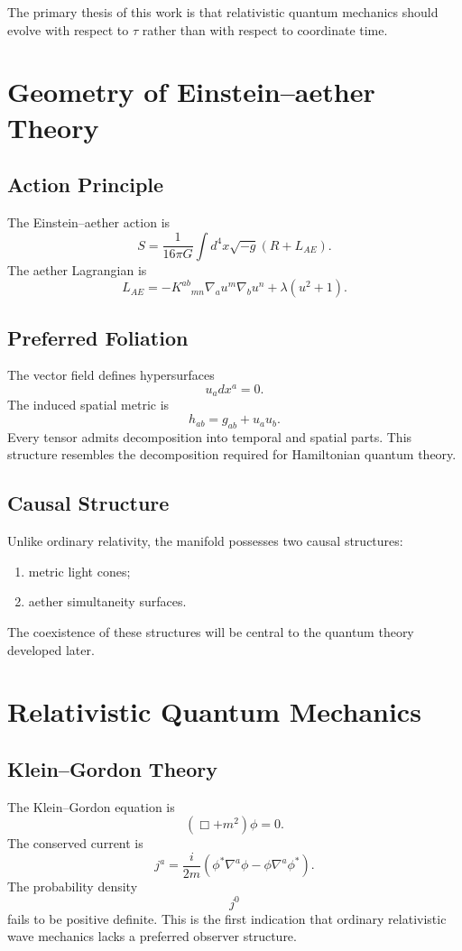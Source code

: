 \documentclass[11pt]{book}
\begin{document}
The primary thesis of this work is that relativistic quantum
mechanics should evolve with respect to $\tau$ rather than
with respect to coordinate time.

\chapter{Geometry of Einstein--aether Theory}
\section{Action Principle}
The Einstein--aether action is
\[S=\frac{1}{16\pi G}\int d^4x \sqrt{-g}\left(R+L_{AE}\right).\]
The aether Lagrangian is
\[L_{AE}=-K^{ab}{}_{mn}\nabla_a u^m\nabla_b u^n+\lambda(u^2+1).\]

\section{Preferred Foliation}
The vector field defines hypersurfaces
\[u_a dx^a =0 .\]
The induced spatial metric is
\[h_{ab}=g_{ab}+u_a u_b.\]
Every tensor admits decomposition into temporal and spatial
parts.
This structure resembles the decomposition required for
Hamiltonian quantum theory.

\section{Causal Structure}
Unlike ordinary relativity, the manifold possesses two
causal structures:
\begin{enumerate}
\item metric light cones;
\item aether simultaneity surfaces.
\end{enumerate}
The coexistence of these structures will be central to the
quantum theory developed later.

\chapter{Relativistic Quantum Mechanics}
\section{Klein--Gordon Theory}
The Klein--Gordon equation is
\[(\Box+m^2)\phi=0.\]
The conserved current is
\[j^a=\frac{i}{2m}(\phi^*\nabla^a\phi-\phi\nabla^a\phi^*).\]
The probability density
\[j^0\]
fails to be positive definite.
This is the first indication that ordinary relativistic
wave mechanics lacks a preferred observer structure.
\end{document}
